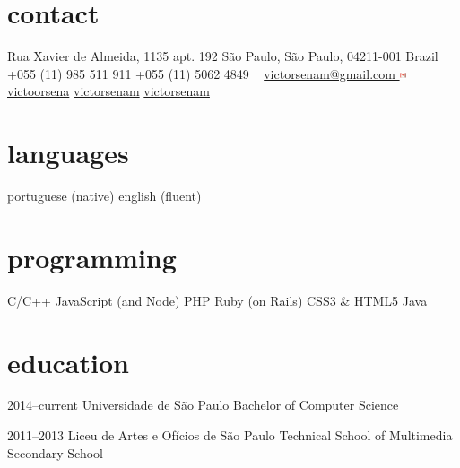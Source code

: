 \documentclass[]{friggeri-cv} %
\begin{document}


\begin{aside} %
\section{contact}
Rua Xavier de Almeida, 1135 apt. 192
São Paulo, São Paulo, 04211-001
Brazil
~
+055 (11) 985 511 911
+055 (11) 5062 4849
~
\href{mailto:victorsenam@gmail.com}{victorsenam@gmail.com \includegraphics[width=0.2cm]{img/gmail.png}}
\href{http://facebook.com/victoorsena}{victoorsena}
\href{http://github.com/victorsenam}{victorsenam}
\href{http://codeforces.com/profiles/victorsenam}{victorsenam}
\section{languages}
portuguese (native)
english (fluent)
\section{programming}
C/C++
JavaScript (and Node)
PHP
Ruby (on Rails)
CSS3 \& HTML5
Java
\end{aside}


\section{education}

\begin{entrylist}


\entry
{2014--current}
{Universidade de São Paulo}
{Bachelor of Computer Science}

\entry
{2011--2013}
{Liceu de Artes e Ofícios de São Paulo}
{Technical School of Multimedia \\
Secondary School}


\end{entrylist}
\end{document}
